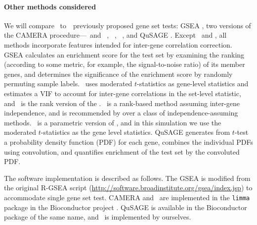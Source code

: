 	
	\paragraph{Other methods considered}
	
	We will compare \OurMethod~to~\HowmanyTest~previously proposed gene set tests: GSEA
	\citep{subramanian2005gene}, two versions of the CAMERA procedure---\CMT~and
	\CMR~\citep{wu2012camera}, \gent~\citep{tian2005discovering}, 
	\genr~\citep{michaud2008integrative},
	and QuSAGE \citep{yaari2013quantitative}. Except \gent~and \genr, all methods incorporate 
	features intended for inter-gene correlation correction. GSEA calculates an enrichment score 
	for the test set by examining the ranking (according to some metric, for example, the 
	signal-to-noise ratio) of its member genes, and determines the significance of the enrichment 
	score by randomly permuting sample labels. \CMT~uses moderated $t$-statistics 
	\citep{Smyth2004moderated} as gene-level statistics and estimates a VIF to account for 
	inter-gene correlations in the set-level statistic, and \CMR~is the rank version of the \CMT.
	\genr~is a rank-based method assuming inter-gene independence, and is recommended by 
	\citet{tarca2013comparison} over a class of independence-assuming methods. \gent~is a 
	parametric 
	version of \genr, and in this simulation we use the moderated $t$-statistics as the gene level 
	statistics. 
	QuSAGE generates
	from $t$-test a probability density function (PDF) for each gene, combines the individual PDFs 
	using
	convolution, and quantifies enrichment of the test set by the convoluted PDF. 
	
	
	The software implementation is described as follows. The GSEA is modified from the original 
	R-GSEA script (\url{http://software.broadinstitute.org/gsea/index.jsp}) to accommodate single 
	gene set test.
	CAMERA and \genr~are implemented in the \verb|limma| package \citep{smyth2005limma} in the 
	Bioconductor
	project \citep{gentleman2004bioconductor}. QuSAGE is available in the Bioconductor package of 
	the
	same name, and \gent~is implemented by ourselves. 
	


